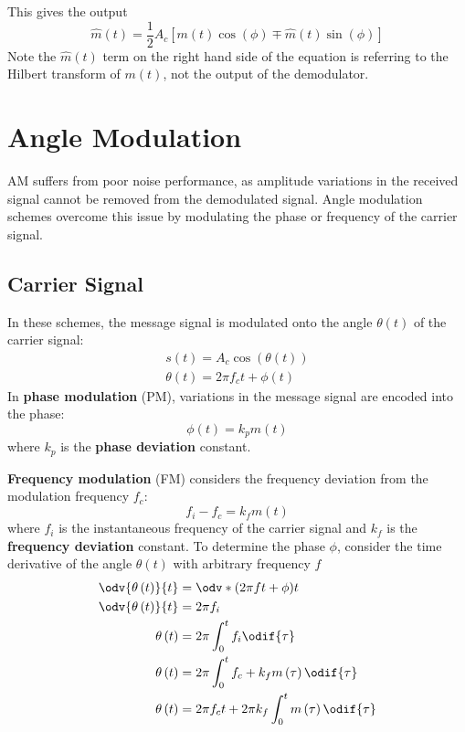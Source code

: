 \documentclass{article}
\begin{document}
This gives the output
\begin{equation*}
    \hat{m}\left( t \right) = \frac{1}{2} A_c \left[ m\left( t \right) \cos{\left( \phi \right)} \mp \hat{m}\left( t \right) \sin{\left( \phi \right)} \right]
\end{equation*}
Note the \(\hat{m}\left( t \right)\) term on the right hand side of the equation is referring to the Hilbert transform of \(m\left( t \right)\), not the output of the demodulator.
\section{Angle Modulation}
AM suffers from poor noise performance, as amplitude variations in the received signal
cannot be removed from the demodulated signal.
Angle modulation schemes overcome this issue by modulating the phase or frequency of the carrier signal.
\subsection{Carrier Signal}
In these schemes, the message signal is modulated onto the angle \(\theta\left( t \right)\) of
the carrier signal:
\begin{gather*}
    s\left( t \right) = A_c \cos{\left( \theta\left( t \right) \right)} \\
    \theta\left( t \right) = 2\pi f_c t + \phi\left( t \right)
\end{gather*}
In \textbf{phase modulation} (PM), variations in the message signal are encoded into the phase:
\begin{equation*}
    \phi\left( t \right) = k_p m\left( t \right)
\end{equation*}
where \(k_p\) is the \textbf{phase deviation} constant.

\textbf{Frequency modulation} (FM) considers the frequency deviation from the modulation frequency \(f_c\):
\begin{equation*}
    f_i - f_c = k_f m\left( t \right)
\end{equation*}
where \(f_i\) is the instantaneous frequency of the carrier signal and \(k_f\) is the \textbf{frequency deviation} constant.
To determine the phase \(\phi\), consider the time derivative of the angle \(\theta\left( t \right)\) with arbitrary frequency \(f\)
\begin{align*}
    \odv{\theta\left( t \right)}{t} & = \odv*{\left( 2\pi f t + \phi \right)}{t}                        \\
    \odv{\theta\left( t \right)}{t} & = 2\pi f_i                                                        \\
    \theta\left( t \right)          & = 2\pi \int_0^t f_i \odif{\tau}                                   \\
    \theta\left( t \right)          & = 2\pi \int_0^t f_c + k_f m\left( \tau \right) \odif{\tau}        \\
    \theta\left( t \right)          & = 2\pi f_c t + 2\pi k_f \int_0^t m\left( \tau \right) \odif{\tau}
\end{align*}
\end{document}
